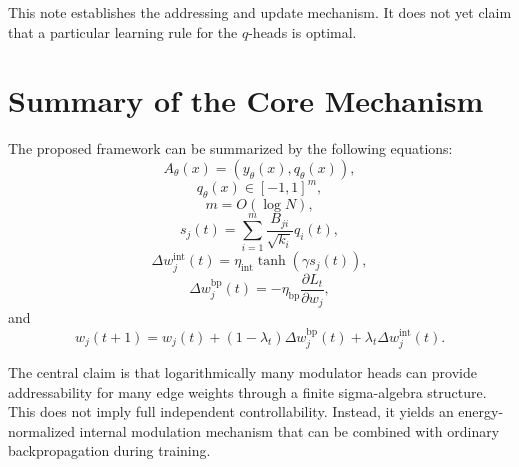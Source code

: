\documentclass[11pt]{article}
\newcommand{\1}{\mathbf{1}}
\begin{document}
This note establishes the addressing and update mechanism. It does not yet claim that a particular learning rule for the \(q\)-heads is optimal.

\section*{Summary of the Core Mechanism}

The proposed framework can be summarized by the following equations:
\[
A_\theta(x)=(y_\theta(x),q_\theta(x)),
\]
\[
q_\theta(x)\in[-1,1]^m,
\]
\[
m=O(\log N),
\]
\[
s_j(t)
=
\sum_{i=1}^m
\frac{B_{ji}}{\sqrt{k_i}}q_i(t),
\]
\[
\Delta w_j^{\mathrm{int}}(t)
=
\eta_{\mathrm{int}}\tanh(\gamma s_j(t)),
\]
\[
\Delta w_j^{\mathrm{bp}}(t)
=
-\eta_{\mathrm{bp}}
\frac{\partial L_t}{\partial w_j},
\]
and
\[
w_j(t+1)
=
w_j(t)
+
(1-\lambda_t)\Delta w_j^{\mathrm{bp}}(t)
+
\lambda_t\Delta w_j^{\mathrm{int}}(t).
\]

The central claim is that logarithmically many modulator heads can provide addressability for many edge weights through a finite sigma-algebra structure. This does not imply full independent controllability. Instead, it yields an energy-normalized internal modulation mechanism that can be combined with ordinary backpropagation during training.
\end{document}
